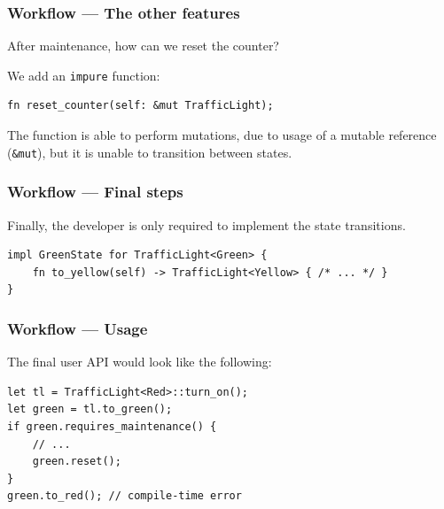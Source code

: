 \documentclass[bigger,notes]{beamer}
\begin{document}
\begin{frame}[fragile]
    \frametitle{Workflow --- The other features}
    After maintenance, how can we reset the counter?

    We add an \texttt{impure} function:
    \begin{listing}
        \centering
        \begin{verbatim}
fn reset_counter(self: &mut TrafficLight);
        \end{verbatim}
    \end{listing}
    The function is able to perform mutations, due to usage of a mutable reference (\texttt{\&mut}),
    but it is unable to transition between states.

\end{frame}

\begin{frame}[fragile]
    \frametitle{Workflow --- Final steps}
    Finally, the developer is only required to implement the state transitions.
    \begin{listing}
        \centering
        \begin{verbatim}
impl GreenState for TrafficLight<Green> {
    fn to_yellow(self) -> TrafficLight<Yellow> { /* ... */ }
}
        \end{verbatim}
    \end{listing}

\end{frame}

\begin{frame}[fragile]
    \frametitle{Workflow --- Usage}
    The final user API would look like the following:
    \begin{listing}
        \centering
        \begin{verbatim}
let tl = TrafficLight<Red>::turn_on();
let green = tl.to_green();
if green.requires_maintenance() {
    // ...
    green.reset();
}
green.to_red(); // compile-time error
        \end{verbatim}
    \end{listing}

\end{frame}
\end{document}

